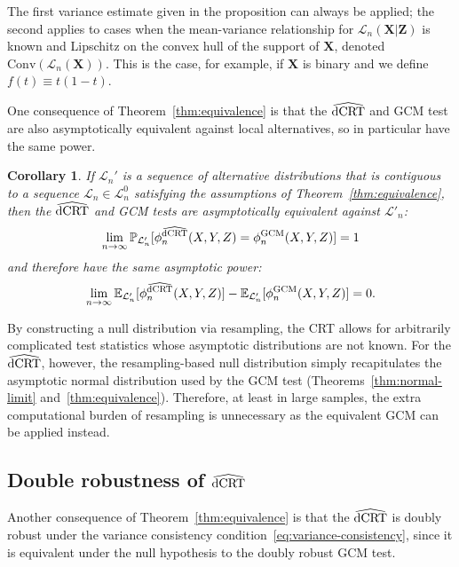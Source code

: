 \documentclass[aos]{imsart}
\theoremstyle{plain}
\newtheorem{corollary}{Corollary}
\theoremstyle{remark}
\newcommand{\E}{\mathbb E}								%
\newcommand{\V}{\mathrm{Var}}							%
\renewcommand{\P}{\mathbb{P}}							%
\newcommand{\prx}{\bm X}								%
\newcommand{\srx}{X}									%
\newcommand{\prz}{\bm Z}								%
\newcommand{\srz}{Z}									%
\newcommand{\sry}{Y}									%
\newcommand{\law}{\mathcal L}							%
\newcommand{\nulllaws}{\mathscr L^0}					%
\newcommand{\lawhat}{\widehat{\mathcal L}}				%
\newcommand{\GCM}{\textnormal{GCM}}						%
\newcommand{\dCRThat}{\widehat{\textnormal{dCRT}}}		%
\begin{document}
The first variance estimate given in the proposition can always be applied; the second applies to cases when the mean-variance relationship for $\law_n(\prx|\prz)$ is known and Lipschitz on the convex hull of the support of $\prx$, denoted $\mathrm{Conv}(\law_{n}(\prx))$. This is the case, for example, if $\prx$ is binary and we define $f(t) \equiv t(1-t)$.

One consequence of Theorem~\ref{thm:equivalence} is that the $\dCRThat$ and GCM test are also asymptotically equivalent against local alternatives, so in particular have the same power.

\begin{corollary} \label{cor:asymptotic-equivalence-alternative}
    If $\law_n'$ is a sequence of alternative distributions that is contiguous to a sequence $\law_n \in \nulllaws_n$ satisfying the assumptions of Theorem~\ref{thm:equivalence}, then the $\dCRThat$ and GCM tests are asymptotically equivalent against $\law'_n$:
    \begin{equation}
        \lim_{n \rightarrow \infty} \P_{\law_n'}[\phi^{\dCRThat}_{n}(\srx, \sry, \srz) = \phi^{\GCM}_{n}(\srx, \sry, \srz)] = 1
        \label{eq:equivalent-tests-alternative}
    \end{equation}
    and therefore have the same asymptotic power:
    \begin{equation}
        \lim_{n \rightarrow \infty} \E_{\law'_n}[\phi_n^{\dCRThat}(\srx, \sry, \srz)] - \E_{\law'_n}[\phi_n^{\GCM}(\srx, \sry, \srz)] = 0.
    \end{equation}
\end{corollary}

By constructing a null distribution via resampling, the CRT allows for arbitrarily complicated test statistics whose asymptotic distributions are not known. For the $\dCRThat$, however, the resampling-based null distribution simply recapitulates the asymptotic normal distribution used by the GCM test (Theorems~\ref{thm:normal-limit} and~\ref{thm:equivalence}). Therefore, at least in large samples, the extra computational burden of resampling is unnecessary as the equivalent GCM can be applied instead.

\subsection{Double robustness of $\dCRThat$} \label{sec:double-robustness}

Another consequence of Theorem~\ref{thm:equivalence} is that the $\dCRThat$ is doubly robust under the variance consistency condition~\eqref{eq:variance-consistency}, since it is equivalent under the null hypothesis to the doubly robust GCM test. %
\end{document}
